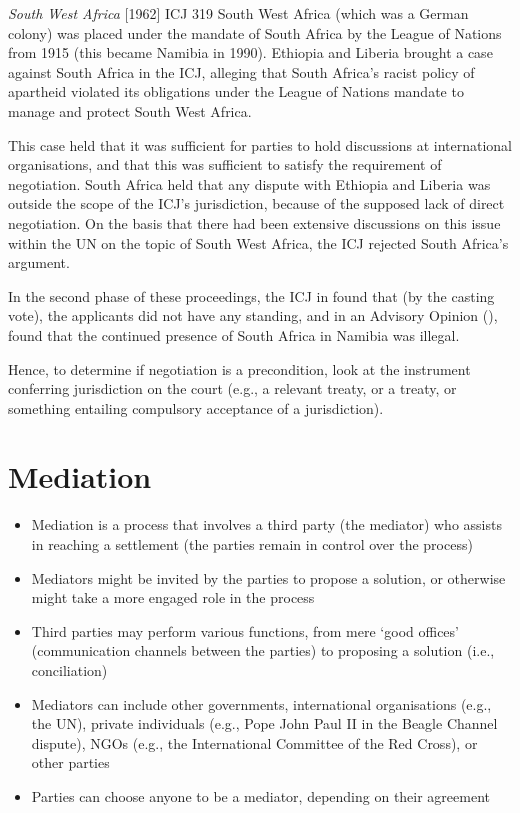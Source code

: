 \begin{casedetails}{\textit{South West Africa} [1962] ICJ 319}
    \flushleft
    South West Africa (which was a German colony) was placed under the mandate of South Africa by the League of Nations from 1915 (this became Namibia in 1990). Ethiopia and Liberia brought a case against South Africa in the ICJ, alleging that South Africa's racist policy of apartheid violated its obligations under the League of Nations mandate to manage and protect South West Africa.

    \vspace{\baselineskip}

    This case held that it was sufficient for parties to hold discussions at international organisations, and that this was sufficient to satisfy the requirement of negotiation. South Africa held that any dispute with Ethiopia and Liberia was outside the scope of the ICJ's jurisdiction, because of the supposed lack of direct negotiation. On the basis that there had been extensive discussions on this issue within the UN on the topic of South West Africa, the ICJ rejected South Africa's argument.

    \vspace{\baselineskip}

    In the second phase of these proceedings, the ICJ in  found that (by the casting vote), the applicants did not have any standing, and in an Advisory Opinion (), found that the continued presence of South Africa in Namibia was illegal.

    \vspace{\baselineskip}

    Hence, to determine if negotiation is a precondition, look at the instrument conferring jurisdiction on the court (e.g., a relevant treaty, or a treaty, or something entailing compulsory acceptance of a jurisdiction).
\end{casedetails}

\section{Mediation}
\begin{itemize}
    \item Mediation is a process that involves a third party (the mediator) who assists in reaching a settlement (the parties remain in control over the process)
    \item Mediators might be invited by the parties to propose a solution, or otherwise might take a more engaged role in the process
    \item Third parties may perform various functions, from mere `good offices' (communication channels between the parties) to proposing a solution (i.e., conciliation)
    \item Mediators can include other governments, international organisations (e.g., the UN), private individuals (e.g., Pope John Paul II in the Beagle Channel dispute), NGOs (e.g., the International Committee of the Red Cross), or other parties
    \item Parties can choose anyone to be a mediator, depending on their agreement
\end{itemize}

